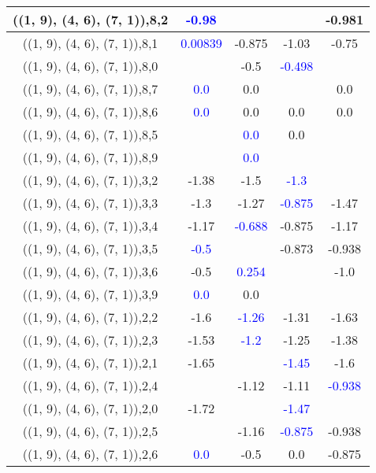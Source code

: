 \documentclass{article}
\begin{document}
\begin{center}
\begin{longtable}{|c|c|c|c|c|}
        	\hline
        	((1, 9), (4, 6), (7, 1)),8,2& \textcolor{blue}{-0.98}&&&-0.981\\
        	\hline
        	((1, 9), (4, 6), (7, 1)),8,1& \textcolor{blue}{0.00839}&-0.875&-1.03&-0.75\\
        	\hline
        	((1, 9), (4, 6), (7, 1)),8,0&&-0.5& \textcolor{blue}{-0.498}&\\
        	\hline
        	((1, 9), (4, 6), (7, 1)),8,7& \textcolor{blue}{0.0}&0.0&&0.0\\
        	\hline
        	((1, 9), (4, 6), (7, 1)),8,6& \textcolor{blue}{0.0}&0.0&0.0&0.0\\
        	\hline
        	((1, 9), (4, 6), (7, 1)),8,5&& \textcolor{blue}{0.0}&0.0&\\
        	\hline
        	((1, 9), (4, 6), (7, 1)),8,9&& \textcolor{blue}{0.0}&&\\
        	\hline
        	((1, 9), (4, 6), (7, 1)),3,2&-1.38&-1.5& \textcolor{blue}{-1.3}&\\
        	\hline
        	((1, 9), (4, 6), (7, 1)),3,3&-1.3&-1.27& \textcolor{blue}{-0.875}&-1.47\\
        	\hline
        	((1, 9), (4, 6), (7, 1)),3,4&-1.17& \textcolor{blue}{-0.688}&-0.875&-1.17\\
        	\hline
        	((1, 9), (4, 6), (7, 1)),3,5& \textcolor{blue}{-0.5}&&-0.873&-0.938\\
        	\hline
        	((1, 9), (4, 6), (7, 1)),3,6&-0.5& \textcolor{blue}{0.254}&&-1.0\\
        	\hline
        	((1, 9), (4, 6), (7, 1)),3,9& \textcolor{blue}{0.0}&0.0&&\\
        	\hline
        	((1, 9), (4, 6), (7, 1)),2,2&-1.6& \textcolor{blue}{-1.26}&-1.31&-1.63\\
        	\hline
        	((1, 9), (4, 6), (7, 1)),2,3&-1.53& \textcolor{blue}{-1.2}&-1.25&-1.38\\
        	\hline
        	((1, 9), (4, 6), (7, 1)),2,1&-1.65&& \textcolor{blue}{-1.45}&-1.6\\
        	\hline
        	((1, 9), (4, 6), (7, 1)),2,4&&-1.12&-1.11& \textcolor{blue}{-0.938}\\
        	\hline
        	((1, 9), (4, 6), (7, 1)),2,0&-1.72&& \textcolor{blue}{-1.47}&\\
        	\hline
        	((1, 9), (4, 6), (7, 1)),2,5&&-1.16& \textcolor{blue}{-0.875}&-0.938\\
        	\hline
        	((1, 9), (4, 6), (7, 1)),2,6& \textcolor{blue}{0.0}&-0.5&0.0&-0.875\\

\end{longtable}
\end{center}
\end{document}
